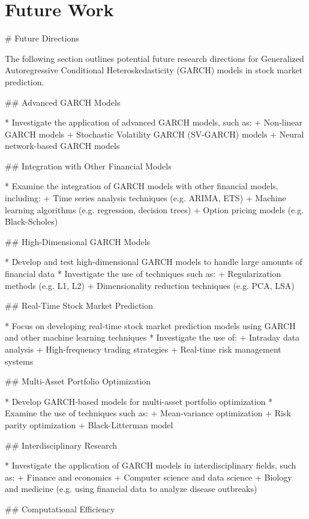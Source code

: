 \documentclass[conference]{IEEEtran}
\begin{document}
\section{Future Work}
\# Future Directions

The following section outlines potential future research directions for Generalized Autoregressive Conditional Heteroskedasticity (GARCH) models in stock market prediction.

\#\# Advanced GARCH Models

* Investigate the application of advanced GARCH models, such as:
	+ Non-linear GARCH models
	+ Stochastic Volatility GARCH (SV-GARCH) models
	+ Neural network-based GARCH models

\#\# Integration with Other Financial Models

* Examine the integration of GARCH models with other financial models, including:
	+ Time series analysis techniques (e.g. ARIMA, ETS)
	+ Machine learning algorithms (e.g. regression, decision trees)
	+ Option pricing models (e.g. Black-Scholes)

\#\# High-Dimensional GARCH Models

* Develop and test high-dimensional GARCH models to handle large amounts of financial data
* Investigate the use of techniques such as:
	+ Regularization methods (e.g. L1, L2)
	+ Dimensionality reduction techniques (e.g. PCA, LSA)

\#\# Real-Time Stock Market Prediction

* Focus on developing real-time stock market prediction models using GARCH and other machine learning techniques
* Investigate the use of:
	+ Intraday data analysis
	+ High-frequency trading strategies
	+ Real-time risk management systems

\#\# Multi-Asset Portfolio Optimization

* Develop GARCH-based models for multi-asset portfolio optimization
* Examine the use of techniques such as:
	+ Mean-variance optimization
	+ Risk parity optimization
	+ Black-Litterman model

\#\# Interdisciplinary Research

* Investigate the application of GARCH models in interdisciplinary fields, such as:
	+ Finance and economics
	+ Computer science and data science
	+ Biology and medicine (e.g. using financial data to analyze disease outbreaks)

\#\# Computational Efficiency
\end{document}

